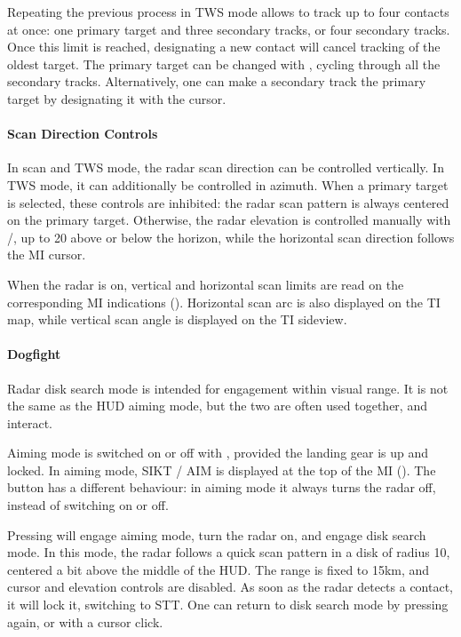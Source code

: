 Repeating the previous process in TWS mode allows to track up to four contacts at once:
one primary target and three secondary tracks, or four secondary tracks.
Once this limit is reached, designating a new contact will cancel tracking of the oldest target.
The primary target can be changed with , cycling through all the secondary tracks.
Alternatively, one can make a secondary track the primary target by designating it with the cursor.

\paragraph{Scan Direction Controls}
In scan and TWS mode, the radar scan direction can be controlled vertically.
In TWS mode, it can additionally be controlled in azimuth.
When a primary target is selected, these controls are inhibited:
the radar scan pattern is always centered on the primary target.
Otherwise, the radar elevation is controlled manually with \keys{<}/\keys{>},
up to 20\textdegree{} above or below the horizon,
while the horizontal scan direction follows the MI cursor.

When the radar is on, vertical and horizontal scan limits are read on
the corresponding MI indications ().
Horizontal scan arc is also displayed on the TI map,
while vertical scan angle is displayed on the TI sideview.

\paragraph{Dogfight}
Radar disk search mode is intended for engagement within visual range.
It is not the same as the HUD aiming mode, but the two are often used together, and interact.

Aiming mode is switched on or off with , provided the landing gear is up and locked.
In aiming mode, SIKT / AIM is displayed at the top of the MI ().
The button  has a different behaviour:
in aiming mode it always turns the radar off, instead of switching on or off.

Pressing  will engage aiming mode, turn the radar on, and engage disk search mode.
In this mode, the radar follows a quick scan pattern in a disk of radius 10\textdegree{},
centered a bit above the middle of the HUD.
The range is fixed to 15km, and cursor and elevation controls are disabled.
As soon as the radar detects a contact, it will lock it, switching to STT.
One can return to disk search mode by pressing  again, or with a cursor click.

